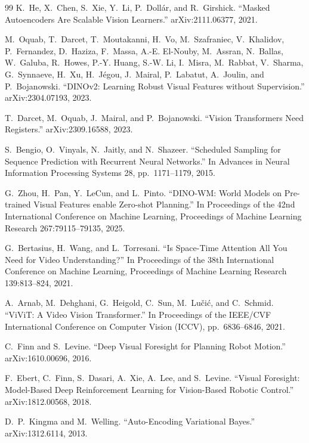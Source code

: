 \documentclass[12pt]{report}
\begin{document}
\begin{thebibliography}{99}
K.~He, X.~Chen, S.~Xie, Y.~Li, P.~Doll{\'a}r, and R.~Girshick.
``Masked Autoencoders Are Scalable Vision Learners.''
arXiv:2111.06377, 2021.

M.~Oquab, T.~Darcet, T.~Moutakanni, H.~Vo, M.~Szafraniec, V.~Khalidov, P.~Fernandez, D.~Haziza, F.~Massa, A.-E. El-Nouby, M.~Assran, N.~Ballas, W.~Galuba, R.~Howes, P.-Y. Huang, S.-W. Li, I.~Misra, M.~Rabbat, V.~Sharma, G.~Synnaeve, H.~Xu, H.~J{\'e}gou, J.~Mairal, P.~Labatut, A.~Joulin, and P.~Bojanowski.
``DINOv2: Learning Robust Visual Features without Supervision.''
arXiv:2304.07193, 2023.

T.~Darcet, M.~Oquab, J.~Mairal, and P.~Bojanowski.
``Vision Transformers Need Registers.''
arXiv:2309.16588, 2023.

S.~Bengio, O.~Vinyals, N.~Jaitly, and N.~Shazeer.
``Scheduled Sampling for Sequence Prediction with Recurrent Neural Networks.''
In Advances in Neural Information Processing Systems 28,
pp.~1171--1179, 2015.

G.~Zhou, H.~Pan, Y.~LeCun, and L.~Pinto.
``DINO-WM: World Models on Pre-trained Visual Features enable Zero-shot Planning.''
In Proceedings of the 42nd International Conference on Machine Learning,
Proceedings of Machine Learning Research 267:79115--79135, 2025.

G.~Bertasius, H.~Wang, and L.~Torresani.
``Is Space-Time Attention All You Need for Video Understanding?''
In Proceedings of the 38th International Conference on Machine Learning,
Proceedings of Machine Learning Research 139:813--824, 2021.

A.~Arnab, M.~Dehghani, G.~Heigold, C.~Sun, M.~Lu\v{c}i\'c, and C.~Schmid.
``ViViT: A Video Vision Transformer.''
In Proceedings of the IEEE/CVF International Conference on Computer Vision (ICCV),
pp.~6836--6846, 2021.

C.~Finn and S.~Levine.
``Deep Visual Foresight for Planning Robot Motion.''
arXiv:1610.00696, 2016.

F.~Ebert, C.~Finn, S.~Dasari, A.~Xie, A.~Lee, and S.~Levine.
``Visual Foresight: Model-Based Deep Reinforcement Learning for Vision-Based Robotic Control.''
arXiv:1812.00568, 2018.

D.~P.~Kingma and M.~Welling.
``Auto-Encoding Variational Bayes.''
arXiv:1312.6114, 2013.


\end{thebibliography}
\end{document}
